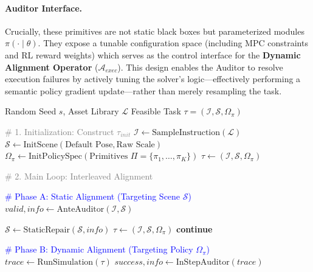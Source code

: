 \documentclass{article}
\theoremstyle{plain}
\theoremstyle{definition}
\theoremstyle{remark}
\begin{document}
\paragraph{Auditor Interface.}
Crucially, these primitives are not static black boxes but parameterized modules $\pi(\cdot \mid \theta)$. They expose a tunable configuration space (including MPC constraints and RL reward weights) which serves as the control interface for the \textbf{Dynamic Alignment Operator} ($\mathcal{A}_{exec}$). This design enables the Auditor to resolve execution failures by actively tuning the solver's logic—effectively performing a semantic policy gradient update—rather than merely resampling the task.

\begin{algorithm}[h]
   \caption{FATE: Feasibility-Aware Task Generation}
   \label{alg:fate_final}
\begin{algorithmic}[1]
    Random Seed $s$, Asset Library $\mathcal{L}$
    Feasible Task $\tau = (\mathcal{I}, \mathcal{S}, \Omega_{\pi})$
   
   \vspace{0.3em}
   \STATE \textcolor{gray}{\# 1. Initialization: Construct $\tau_{init}$}
   \STATE $\mathcal{I} \leftarrow \text{SampleInstruction}(\mathcal{L})$ 
   \STATE $\mathcal{S} \leftarrow \text{InitScene}(\text{Default Pose}, \text{Raw Scale})$ 
   \STATE $\Omega_{\pi} \leftarrow \text{InitPolicySpec}(\text{Primitives } \Pi = \{\pi_1, \dots, \pi_K\})$ 
   \STATE $\tau \leftarrow (\mathcal{I}, \mathcal{S}, \Omega_{\pi})$ 
   
   \vspace{0.3em}
   \STATE \textcolor{gray}{\# 2. Main Loop: Interleaved Alignment}
       
       \vspace{0.2em}
       \STATE \textcolor{blue}{\# Phase A: Static Alignment (Targeting Scene $\mathcal{S}$)}
       \STATE $valid, info \leftarrow \text{AnteAuditor}(\mathcal{I}, \mathcal{S})$ 
       
           \STATE {}
           \STATE $\mathcal{S} \leftarrow \text{StaticRepair}(\mathcal{S}, info)$ 
           \STATE $\tau \leftarrow (\mathcal{I}, \mathcal{S}, \Omega_{\pi})$
           \STATE \textbf{continue} 
       \ENDIF

       \vspace{0.2em}
       \STATE \textcolor{blue}{\# Phase B: Dynamic Alignment (Targeting Policy $\Omega_{\pi}$)}
       \STATE $trace \leftarrow \text{RunSimulation}(\tau)$ 
       \STATE $success, info \leftarrow \text{InStepAuditor}(trace)$
       

\end{algorithmic}
\end{algorithm}
\end{document}
